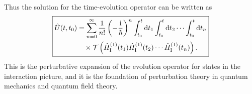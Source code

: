 Thus the solution for the time-evolution operator can be written as
\begin{equation}
 \boxed{\begin{aligned}
 \hat{U}(t,t_0)&=\sum_{n=0}^{\infty}\frac1{n!}
 \left(-\frac{\mathrm{i}}{\hbar}\right)^n
 \int_{t_0}^{t}\mathrm{d} t_1\int_{t_0}^{t}\mathrm{d} t_2\cdots
 \int_{t_0}^{t}\mathrm{d} t_n\\
 &\quad\times \mathcal{T}\left(\hat{H}^{(1)}_{\mathrm I}(t_1)
 \hat{H}^{(1)}_{\mathrm I}(t_2)\cdots
 \hat{H}^{(1)}_{\mathrm I}(t_n)\right).
 \end{aligned}}
\end{equation}
This is the perturbative expansion of the evolution operator for states in the interaction picture, and it is the foundation of perturbation theory in quantum mechanics and quantum field theory.